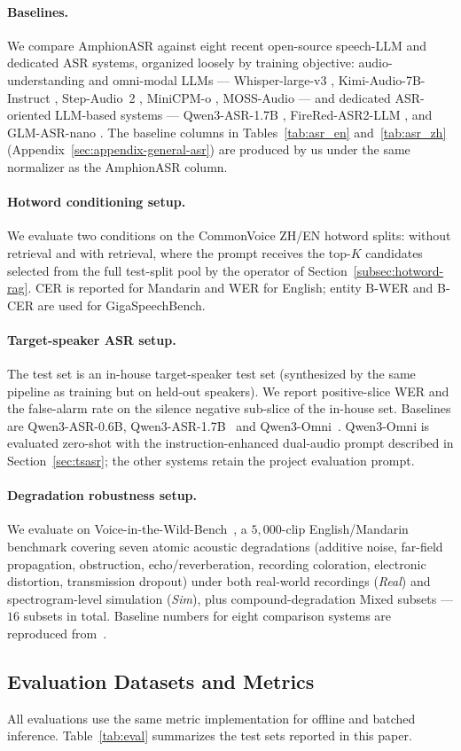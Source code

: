 \paragraph{Baselines.}
We compare AmphionASR against eight recent open-source speech-LLM and
dedicated ASR systems, organized loosely by training objective:
audio-understanding and omni-modal LLMs --- Whisper-large-v3
\cite{radford2023whisper}, Kimi-Audio-7B-Instruct \cite{kimiaudio2025},
Step-Audio~2 \cite{stepaudio22025}, MiniCPM-o \cite{minicpm2025},
MOSS-Audio \cite{moss2026audio} --- and dedicated ASR-oriented
LLM-based systems --- Qwen3-ASR-1.7B \cite{qwen2025qwen3asr},
FireRed-ASR2-LLM \cite{fireredasr2025}, and GLM-ASR-nano
\cite{glmasr2025}. The baseline columns in
Tables~\ref{tab:asr_en} and~\ref{tab:asr_zh}
(Appendix~\ref{sec:appendix-general-asr}) are produced by us under the
same normalizer as the AmphionASR column.

\paragraph{Hotword conditioning setup.}
We evaluate two conditions on the CommonVoice ZH/EN hotword splits:
without retrieval and with retrieval, where the prompt receives the
top-$K$ candidates selected from the full test-split pool by the
operator of Section~\ref{subsec:hotword-rag}. CER is reported for
Mandarin and WER for English; entity B-WER and B-CER are used for
GigaSpeechBench.

\paragraph{Target-speaker ASR setup.}
The test set is an in-house target-speaker test set
(synthesized by the same pipeline as training but on held-out
speakers). We report positive-slice WER and the false-alarm rate on the
silence negative sub-slice of the in-house set.
Baselines are Qwen3-ASR-0.6B, Qwen3-ASR-1.7B~\cite{qwen2025qwen3asr}
and Qwen3-Omni~\cite{qwen2025qwen3omni}. Qwen3-Omni is evaluated
zero-shot with the instruction-enhanced dual-audio prompt described in
Section~\ref{sec:tsasr}; the other systems retain the project evaluation
prompt.

\paragraph{Degradation robustness setup.}
We evaluate on Voice-in-the-Wild-Bench~\cite{xie2026mega}, a
$5{,}000$-clip English/Mandarin benchmark covering seven atomic
acoustic degradations (additive noise, far-field propagation,
obstruction, echo/reverberation, recording coloration, electronic
distortion, transmission dropout) under both real-world recordings
(\emph{Real}) and spectrogram-level simulation (\emph{Sim}), plus
compound-degradation Mixed subsets --- $16$ subsets in total. Baseline
numbers for eight comparison systems are reproduced
from~\cite{xie2026mega}.

\subsection{Evaluation Datasets and Metrics}
\label{subsec:eval-data}

All evaluations use the same metric implementation for offline and
batched inference.
Table~\ref{tab:eval} summarizes the test sets reported in this paper.
